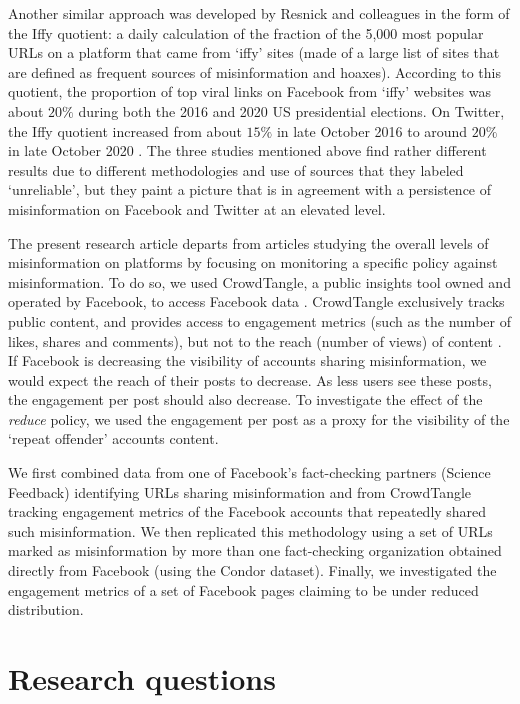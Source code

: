 \documentclass[review]{elsarticle}
\begin{document}
Another similar approach was developed by Resnick and colleagues \cite{resnick2018iffy} in the form of the Iffy quotient: a daily calculation of the fraction of the 5,000 most popular URLs on a platform that came from `iffy' sites (made of a large list of sites that are defined as frequent sources of misinformation and hoaxes). 
According to this quotient, the proportion of top viral links on Facebook from `iffy' websites was about $20\%$ during both the 2016 and 2020 US presidential elections. 
On Twitter, the Iffy quotient increased from about $15\%$ in late October 2016 to around $20\%$ in late October 2020 \cite{IffyQuotient}. 
The three studies mentioned above find rather different results due to different methodologies and use of sources that they labeled `unreliable', but they paint a picture that is in agreement with a persistence of misinformation on Facebook and Twitter at an elevated level.

The present research article departs from articles studying the overall levels of misinformation on platforms by focusing on monitoring a specific policy against misinformation.
To do so, we used CrowdTangle, a public insights tool owned and operated by Facebook, to access Facebook data \citep{team2020crowdtangle}. 
CrowdTangle exclusively tracks public content, and provides access to engagement metrics (such as the number of likes, shares and comments), but not to the reach (number of views) of content \citep{helpCT}.
If Facebook is decreasing the visibility of accounts sharing misinformation, we would expect the reach of their posts to decrease.
As less users see these posts, the engagement per post should also decrease.
To investigate the effect of the {\it reduce} policy, we used the engagement per post as a proxy for the visibility of the `repeat offender' accounts content.
 
We first combined data from one of Facebook's fact-checking partners (Science Feedback) identifying URLs sharing misinformation and from CrowdTangle tracking engagement metrics of the Facebook accounts that repeatedly shared such misinformation.
We then replicated this methodology using a set of URLs marked as misinformation by more than one fact-checking organization obtained directly from Facebook (using the Condor dataset).
Finally, we investigated the engagement metrics of a set of Facebook pages claiming to be under reduced distribution.

\section{Research questions}
\end{document}
